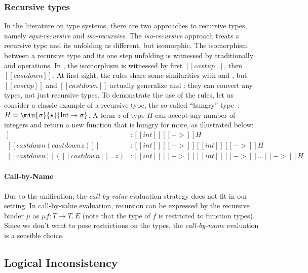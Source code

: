 \subsubsection{Recursive types}
In the literature on type systems, there are two approaches to
recursive types, namely \emph{equi-recursive} and
\emph{iso-recursive}. The \emph{iso-recursive} approach treats a
recursive type and its unfolding as different, but isomorphic. The
isomorphism between a recursive type and its one step unfolding is
witnessed by traditionally \fold and \unfold operations. In \name, the
isomorphism is witnessed by first $[[castup]]$, then
$[[castdown]]$.    At first sight, the \cast rules share some
similarities with \fold and \unfold, but $[[castup]]$ and
$[[castdown]]$ actually generalize \fold and \unfold: they can convert
any types, not just recursive types. To demonstrate the use of the
\cast rules, let us consider a classic example of a recursive type,
the so-called ``hungry'' type~\cite{tapl}:
$H = \miu{\sigma}{\star}{\mathsf{Int} \rightarrow \sigma}$. A term $z$
of type $H$ can accept any number of integers and return a new
function that is hungry for more, as illustrated below:
\begin{align*}
[[castdown z]] &: [[int]][[->]]H  \\
[[castdown(castdown z)]] &: [[int]][[->]][[int]][[->]]H \\
[[castdown]]([[castdown]] \dots z) &: [[int]][[->]][[int]][[->]]\dots[[->]]H
\end{align*}


\paragraph{Call-by-Name}
Due to the unification, the \emph{call-by-value} evaluation strategy
does not fit in our setting. In call-by-value evaluation, recursion
can be expressed by the recursive binder $\mu$ as $\mu f : T
\rightarrow T.\, E$ (note that the type of $f$ is restricted to
function types). Since we don't want to pose restrictions on the
types, the \emph{call-by-name} evaluation is a sensible choice.

\subsection{Logical Inconsistency}

